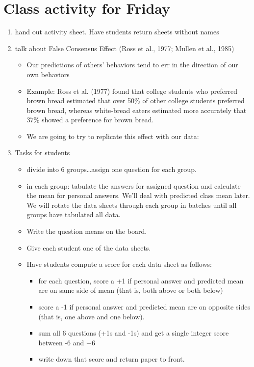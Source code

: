 \documentclass[11pt]{article}
\begin{document}
\section*{Class activity for Friday}
\label{sec-4}
\begin{enumerate}
\item hand out activity sheet.  Have students return sheets without names
\item talk about False Consensus Effect (Ross et al., 1977; Mullen et al., 1985)
\begin{itemize}
\item Our predictions of others' behaviors tend to err in the direction of our own behaviors
\item Example: Ross et al. (1977) found that college students who preferred brown bread estimated that over 50\% of other college students preferred brown bread, whereas white-bread eaters estimated more accurately that 37\% showed a preference for brown bread.
\item We are going to try to replicate this effect with our data:
\end{itemize}

\item Tasks for students
\begin{itemize}
\item divide into 6 groups\ldots{}assign one question for each group.
\item in each group: tabulate the answers for assigned question and calculate the mean for personal answers.  We'll deal with predicted class mean later.  We will rotate the data sheets through each group in batches until all groups have tabulated all data.
\item Write the question means on the board.
\item Give each student one of the data sheets.
\item Have students compute a score for each data sheet as follows:
\begin{itemize}
\item for each question, score a +1 if personal answer and predicted mean are on same side of mean (that is, both above or both below)
\item score a -1 if personal answer and predicted mean are on opposite sides (that is, one above and one below).
\item sum all 6 questions (+1s and -1s) and get a single integer score between -6 and +6
\item write down that score and return paper to front.
\end{itemize}
\end{itemize}


\end{enumerate}
\end{document}

